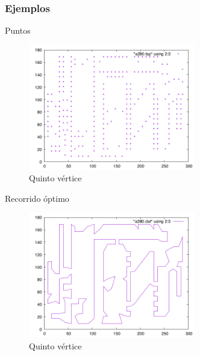 \subsubsection{Ejemplos}

\begin{frame}
	\begin{exampleblock}{Puntos}
	\begin{figure}[htbH]
		\centering
		\includegraphics[width=0.65\textwidth]{../Viajante/Imagenes/a280.png}
		\caption{Quinto vértice}
	\end{figure}
	\end{exampleblock}
\end{frame}

\begin{frame}
	\begin{exampleblock}{Recorrido óptimo}
	\begin{figure}[htbH]
		\centering
		\includegraphics[width=0.65\textwidth]{../Viajante/Imagenes/a280_opt.png}
		\caption{Quinto vértice}
	\end{figure}
	\end{exampleblock}
\end{frame}

















